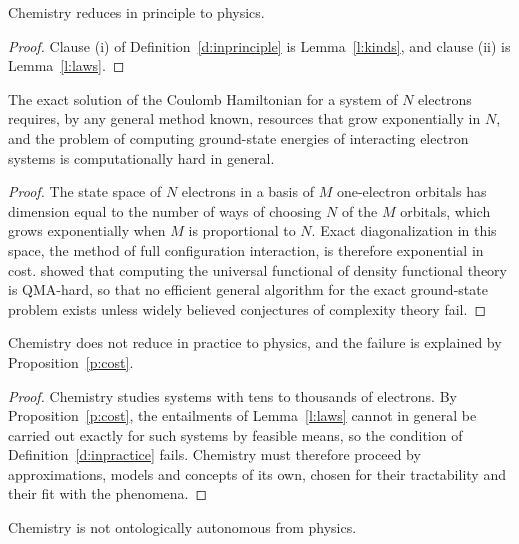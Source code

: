 \documentclass{situationist-preprint}
\begin{document}
\begin{theorem}\label{t:reduction}
Chemistry reduces in principle to physics.
\end{theorem}

\begin{proof}
Clause (i) of Definition~\ref{d:inprinciple} is Lemma~\ref{l:kinds}, and clause (ii) is Lemma~\ref{l:laws}.
\end{proof}

\begin{proposition}\label{p:cost}
The exact solution of the Coulomb Hamiltonian for a system of $N$ electrons requires, by any general method known, resources that grow exponentially in $N$, and the problem of computing ground-state energies of interacting electron systems is computationally hard in general.
\end{proposition}

\begin{proof}
The state space of $N$ electrons in a basis of $M$ one-electron orbitals has dimension equal to the number of ways of choosing $N$ of the $M$ orbitals, which grows exponentially when $M$ is proportional to $N$. Exact diagonalization in this space, the method of full configuration interaction, is therefore exponential in cost. \citet{SchuchVerstraete2009} showed that computing the universal functional of density functional theory is QMA-hard, so that no efficient general algorithm for the exact ground-state problem exists unless widely believed conjectures of complexity theory fail.
\end{proof}

\begin{corollary}\label{c:practice}
Chemistry does not reduce in practice to physics, and the failure is explained by Proposition~\ref{p:cost}.
\end{corollary}

\begin{proof}
Chemistry studies systems with tens to thousands of electrons. By Proposition~\ref{p:cost}, the entailments of Lemma~\ref{l:laws} cannot in general be carried out exactly for such systems by feasible means, so the condition of Definition~\ref{d:inpractice} fails. Chemistry must therefore proceed by approximations, models and concepts of its own, chosen for their tractability and their fit with the phenomena.
\end{proof}

\begin{corollary}\label{c:noautonomy}
Chemistry is not ontologically autonomous from physics.
\end{corollary}
\end{document}
